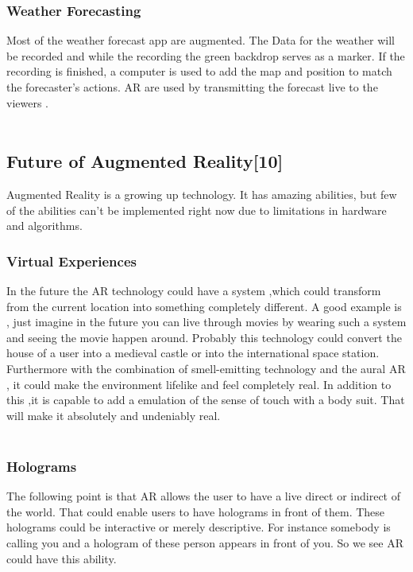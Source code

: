 \subsubsection{Weather Forecasting}
Most of the weather forecast app are augmented. The Data for the weather will be recorded and while the recording  the green backdrop serves as a  marker. If the recording is finished, a computer is used to add the map and position to match the forecaster’s actions. AR  are used by transmitting the forecast live to the viewers .
\\
\\
\subsection{Future of Augmented Reality[10]}
Augmented Reality is a growing up technology. It has amazing abilities, but few of the abilities can’t be implemented right now due to limitations in hardware and algorithms.
\subsubsection{Virtual Experiences}



In the future the AR technology could have a system ,which could transform from the current location into something completely different. A good example is , just imagine in the future you can live through movies by wearing  such a system and seeing the movie happen around. Probably this technology could convert the house of a user into a medieval castle or into the international space station. Furthermore with the combination  of smell-emitting technology and the aural AR , it could make the environment lifelike and  feel completely real. In addition to this ,it is capable to add a emulation of the sense of touch with a body suit. That will make it absolutely and undeniably real. 
\\
\\
\subsubsection{Holograms}
The following point is that AR allows  the user to have a live direct or indirect of the world. That could enable users to have holograms in front of them. These holograms could be interactive or merely descriptive.  For instance somebody is calling you and a hologram of these person appears in front of you. So we see AR could have this ability.
